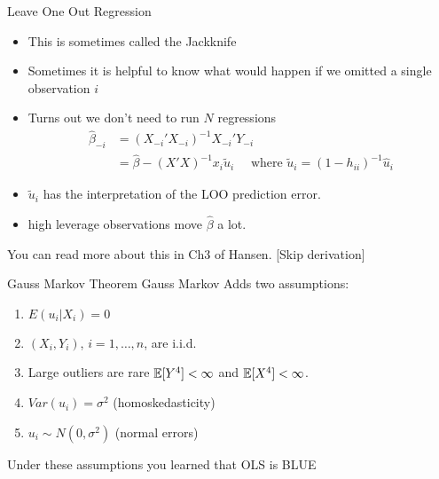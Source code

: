 \begin{frame}{Leave One Out Regression}
\begin{itemize}
\item This is sometimes called the \alert{Jackknife}
\item Sometimes it is helpful to know what would happen if we omitted a single observation $i$
\item Turns out we don't need to run $N$ regressions
\begin{align*}
\widehat{\beta}_{-i} &= (X_{-i}'X_{-i})^{-1} X_{-i}' Y_{-i} \\
&=\widehat{\beta} -  (X 'X)^{-1} x_i  \tilde{u}_i  \quad \mbox{ where } \tilde{u}_i = (1-h_{ii})^{-1}\hat{u}_i
\end{align*}
\item $\tilde{u}_i $ has the interpretation of the \alert{LOO prediction error}.
\item high leverage observations move $\widehat{\beta}$ a lot.
\end{itemize}
You can read more about this in Ch3 of Hansen. [Skip derivation]
\end{frame}







\begin{frame}{Gauss Markov Theorem}
Gauss Markov Adds two assumptions:
\begin{enumerate}
\item $E(u_i |X_i ) = 0$
\item $(X_i,Y_i)$, $i =1,\ldots,n$, are i.i.d.
\item Large outliers are rare $\mathbb{E}[Y^4]< \infty$ and $\mathbb{E}[X^4]<\infty$.
\item $Var(u_i) = \sigma^2$ (homoskedasticity)
\item $u_i \sim N(0,\sigma^2)$ (normal errors)
\end{enumerate}
Under these assumptions you learned that OLS is \alert{BLUE}
\end{frame}




